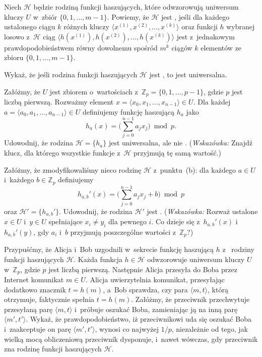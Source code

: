 
\noindent Niech $\mathcal{H}$ będzie rodziną funkcji haszujących, które odwzorowują uniwersum kluczy $U$ w~zbiór $\{0,1,\dots,m-1\}$.  Powiemy, że $\mathcal{H}$ jest {\bfseries{}}, jeśli dla każdego ustalonego ciągu $k$ różnych kluczy $\langle x^{(1)},x^{(2)},\dots,x^{(k)}\rangle$ oraz funkcji $h$ wybranej losowo z~$\mathcal{H}$ ciąg $\langle h(x^{(1)}),h(x^{(2)}),\dots,h(x^{(k)})\rangle$ jest z~jednakowym prawdopodobieństwem równy dowolnemu spośród $m^k$ ciągów $k$ elementów ze zbioru $\{0,1,\dots,m-1\}$.
\begin{description}
	\setlength{}
	\item[{\sffamily\bfseries(a)}] Wykaż, że jeśli rodzina funkcji haszujących $\mathcal{H}$ jest , to jest uniwersalna.
	\item[{\sffamily\bfseries(b)}] Załóżmy, że $U$ jest zbiorem  o~wartościach z~$\mathbb{Z}_p=\{0,1,\dots,p-1\}$, gdzie $p$ jest liczbą pierwszą. Rozważmy element $x=\langle x_0,x_1,\dots,x_{n-1}\rangle\in U$. Dla każdej  $a=\langle a_0,a_1,\dots,a_{n-1}\rangle\in U$ definiujemy funkcję haszującą $h_a$ jako
	\[
		h_a(x) = \biggl(\sum_{j=0}^{n-1}a_jx_j\biggr)\bmod p.
	\]
	Udowodnij, że rodzina $\mathcal{H}=\{h_a\}$ jest uniwersalna, ale nie . (\!\emph{Wskazówka:} Znajdź klucz, dla którego wszystkie funkcje z~$\mathcal{H}$ przyjmują tę samą wartość.)
	\item[{\sffamily\bfseries(c)}] Załóżmy, że zmodyfikowaliśmy nieco rodzinę $\mathcal{H}$ z~punktu~(b): dla każdego $a\in U$ i~każdego $b\in\mathbb{Z}_p$ definiujemy
	\[
		h_{a,b}'(x) = \biggl(\sum_{j=0}^{n-1}a_jx_j+b\biggr)\bmod p
	\]
	oraz $\mathcal{H}'=\{h_{a,b}'\}$. Udowodnij, że rodzina $\mathcal{H}'$ jest . (\!\emph{Wskazówka:} Rozważ ustalone $x\in U$ i~$y\in U$ spełniające $x_i\ne y_i$ dla pewnego $i$. Co dzieje się z~$h_{a,b}'(x)$ i~$h_{a,b}'(y)$, gdy $a_i$ i~$b$ przyjmują poszczególne wartości z~$\mathbb{Z}_p$?)
	\item[{\sffamily\bfseries(d)}] Przypuśćmy, że Alicja i~Bob uzgodnili w~sekrecie funkcję haszującą $h$ z~ rodziny funkcji haszujących $\mathcal{H}$. Każda funkcja $h\in\mathcal{H}$ odwzorowuje uniwersum kluczy $U$ w~$\mathbb{Z}_p$, gdzie $p$ jest liczbą pierwszą. Następnie Alicja przesyła do Boba przez Internet komunikat $m\in U$. Alicja uwierzytelnia komunikat, przesyłając dodatkowo znacznik $t=h(m)$, a~Bob sprawdza, czy para $\langle m,t\rangle$, którą otrzymuje, faktycznie spełnia $t=h(m)$. Załóżmy, że przeciwnik przechwytuje przesyłaną parę $\langle m,t\rangle$ i~próbuje oszukać Boba, zamieniając ją na inną parę $\langle m',t'\rangle$. Wykaż, że prawdopodobieństwo, iż przeciwnikowi uda się oszukać Boba i~zaakceptuje on parę $\langle m',t'\rangle$, wynosi co najwyżej $1/p$, niezależnie od tego, jak wielką mocą obliczeniową przeciwnik dysponuje, i~nawet wówczas, gdy przeciwnik zna rodzinę funkcji haszujących $\mathcal{H}$.

\end{description}
